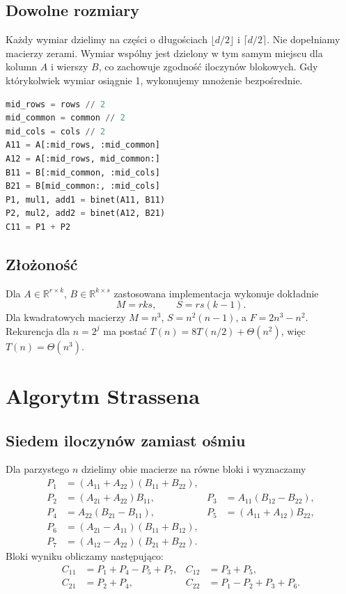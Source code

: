 \documentclass[11pt,a4paper]{article}
\begin{document}
\subsection{Dowolne rozmiary}
Każdy wymiar dzielimy na części o długościach $\lfloor d/2\rfloor$
i $\lceil d/2\rceil$. Nie dopełniamy macierzy zerami.
Wymiar wspólny jest dzielony w tym samym miejscu dla kolumn $A$
i wierszy $B$, co zachowuje zgodność iloczynów blokowych.
Gdy którykolwiek wymiar osiągnie 1, wykonujemy mnożenie bezpośrednie.

\begin{lstlisting}[language=Python,caption={Podział o nierównych rozmiarach bloków.}]
mid_rows = rows // 2
mid_common = common // 2
mid_cols = cols // 2
A11 = A[:mid_rows, :mid_common]
A12 = A[:mid_rows, mid_common:]
B11 = B[:mid_common, :mid_cols]
B21 = B[mid_common:, :mid_cols]
P1, mul1, add1 = binet(A11, B11)
P2, mul2, add2 = binet(A12, B21)
C11 = P1 + P2
\end{lstlisting}

\subsection{Złożoność}
Dla $A\in\mathbb{R}^{r\times k}$, $B\in\mathbb{R}^{k\times s}$
zastosowana implementacja wykonuje dokładnie
\[
 M=rks,\qquad S=rs(k-1).
\]
Dla kwadratowych macierzy $M=n^3$, $S=n^2(n-1)$,
a $F=2n^3-n^2$. Rekurencja dla $n=2^j$ ma postać
$T(n)=8T(n/2)+\Theta(n^2)$, więc $T(n)=\Theta(n^3)$.

\section{Algorytm Strassena}
\subsection{Siedem iloczynów zamiast ośmiu}
Dla parzystego $n$ dzielimy obie macierze na równe bloki i wyznaczamy
\begin{align*}
P_1&=(A_{11}+A_{22})(B_{11}+B_{22}),\\
P_2&=(A_{21}+A_{22})B_{11}, & P_3&=A_{11}(B_{12}-B_{22}),\\
P_4&=A_{22}(B_{21}-B_{11}), & P_5&=(A_{11}+A_{12})B_{22},\\
P_6&=(A_{21}-A_{11})(B_{11}+B_{12}),\\
P_7&=(A_{12}-A_{22})(B_{21}+B_{22}).
\end{align*}
Bloki wyniku obliczamy następująco:
\begin{align*}
C_{11}&=P_1+P_4-P_5+P_7, & C_{12}&=P_3+P_5,\\
C_{21}&=P_2+P_4, & C_{22}&=P_1-P_2+P_3+P_6.
\end{align*}
\end{document}
